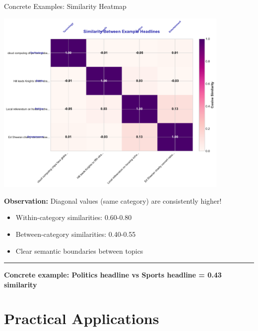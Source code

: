 \documentclass[8pt,aspectratio=169]{beamer}
\newcommand{\bottomnote}[1]{%
\vfill
\vspace{-2mm}
\textcolor{mllavender2}{\rule{\textwidth}{0.4pt}}
\vspace{1mm}
\footnotesize
\textbf{#1}
}
\begin{document}
\begin{frame}[t]{Concrete Examples: Similarity Heatmap}

\begin{center}
\includegraphics[width=0.85\textwidth,height=0.7\textheight]{charts/similarity_heatmap.pdf}
\end{center}

\vspace{0.2cm}

\textbf{Observation:} Diagonal values (same category) are consistently higher!

\begin{itemize}
    \item Within-category similarities: 0.60-0.80
    \item Between-category similarities: 0.40-0.55
    \item Clear semantic boundaries between topics
\end{itemize}

\bottomnote{Concrete example: Politics headline vs Sports headline = 0.43 similarity}
\end{frame}

\section{Practical Applications}
\end{document}
